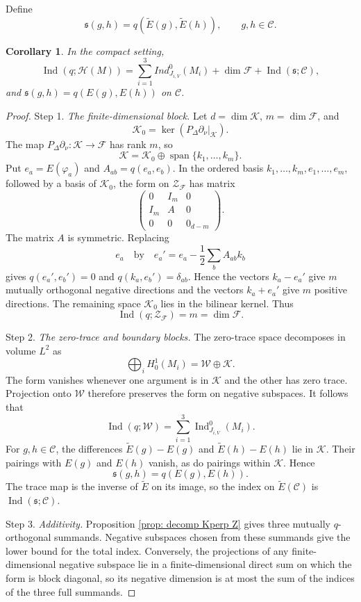 \documentclass[11pt,twoside]{amsart}
\newtheorem{cor}[thm]{Corollary}
\numberwithin{equation}{section}
\begin{document}
Define
\[
\mathfrak s(g,h)=q(\widetilde E(g),\widetilde E(h)),
\qquad g,h\in\mathcal C.
\]

\begin{cor} \label{cor: Kperp Z index restriction}
In the compact setting,
\[
\operatorname{Ind}(q;\mathcal H(M))
=\sum_{i=1}^3Ind_{J_{i,V}}^0(M_i)
+\dim\mathcal F+\operatorname{Ind}(\mathfrak s;\mathcal C),
\]
and $\mathfrak s(g,h)=q(E(g),E(h))$ on $\mathcal C$.
\end{cor}
\begin{proof}
\noindent Step 1. \emph{The finite-dimensional block.}
Let $d=\dim\mathcal K$, $m=\dim\mathcal F$, and
\[
\mathcal K_0=\ker(P_\Delta\partial_\nu|_\mathcal K).
\]
The map $P_\Delta\partial_\nu:\mathcal K\to\mathcal F$ has rank $m$, so
\[
\mathcal K=\mathcal K_0\oplus\operatorname{span}\{k_1,\ldots,k_m\}.
\]
Put $e_a=E(\varphi_a)$ and $A_{ab}=q(e_a,e_b)$. In the ordered basis $k_1,\ldots,k_m,e_1,\ldots,e_m$, followed by a basis of $\mathcal K_0$, the form on $\mathcal Z_\mathcal F$ has matrix
\[
\begin{pmatrix}
0&I_m&0\\
I_m&A&0\\
0&0&0_{d-m}
\end{pmatrix}.
\]
The matrix $A$ is symmetric. Replacing
\[
e_a\quad\text{by}\quad e_a'=e_a-\frac12\sum_bA_{ab}k_b
\]
gives $q(e_a',e_b')=0$ and $q(k_a,e_b')=\delta_{ab}$. Hence the vectors $k_a-e_a'$ give $m$ mutually orthogonal negative directions and the vectors $k_a+e_a'$ give $m$ positive directions. The remaining space $\mathcal K_0$ lies in the bilinear kernel. Thus
\[
\operatorname{Ind}(q;\mathcal Z_\mathcal F)=m=\dim\mathcal F.
\]

\medskip
\noindent Step 2. \emph{The zero-trace and boundary blocks.}
The zero-trace space decomposes in volume $L^2$ as
\[
\bigoplus_iH_0^1(M_i)=\mathcal W\oplus\mathcal K.
\]
The form vanishes whenever one argument is in $\mathcal K$ and the other has zero trace. Projection onto $\mathcal W$ therefore preserves the form on negative subspaces. It follows that
\[
\operatorname{Ind}(q;\mathcal W)=\sum_{i=1}^3\operatorname{Ind}_{J_{i,V}}^0(M_i).
\]
For $g,h\in\mathcal C$, the differences $\widetilde E(g)-E(g)$ and $\widetilde E(h)-E(h)$ lie in $\mathcal K$. Their pairings with $E(g)$ and $E(h)$ vanish, as do pairings within $\mathcal K$. Hence
\[
\mathfrak s(g,h)=q(E(g),E(h)).
\]
The trace map is the inverse of $\widetilde E$ on its image, so the index on $\widetilde E(\mathcal C)$ is $\operatorname{Ind}(\mathfrak s;\mathcal C)$.

\medskip
\noindent Step 3. \emph{Additivity.}
Proposition \ref{prop: decomp Kperp Z} gives three mutually $q$-orthogonal summands. Negative subspaces chosen from these summands give the lower bound for the total index. Conversely, the projections of any finite-dimensional negative subspace lie in a finite-dimensional direct sum on which the form is block diagonal, so its negative dimension is at most the sum of the indices of the three full summands.
\end{proof}
\end{document}

